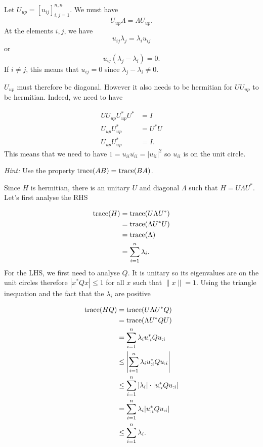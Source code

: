 \begin{solution}
  Let $U_{up} = [u_{ij}]_{i,j=1}^{n,n}$.
  We must have
  \[ U_{up}\Lambda = \Lambda U_{up}. \]
  At the elements $i,j$, we have
  \[ u_{ij} \lambda_j = \lambda_i u_{ij} \]
  or
  \[ u_{ij} (\lambda_j - \lambda_i) = 0. \]
  If $i \neq j$, this means that $u_{ij} = 0$ since $\lambda_j - \lambda_i \neq 0$.

  $U_{up}$ must therefore be diagonal.
  However it also needs to be hermitian for $UU_{up}$ to be hermitian.
  Indeed, we need to have

  \begin{align*}
    UU_{up} U_{up}^*U^* & = I\\
    U_{up} U_{up}^* & = U^*U\\
    U_{up} U_{up}^* & = I.
  \end{align*}
  This means that we need to have $1 = u_{ii}\overline{u_{ii}} = |u_{ii}|^2$
  so $u_{ii}$ is on the unit circle.
\end{solution}

\begin{solution}
  \emph{Hint:}
  Use the property $\operatorname{trace}(AB) = \operatorname{trace}(BA)$.

  Since $H$ is hermitian, there is an unitary $U$ and diagonal $\Lambda$ such that $H = U \Lambda U^*$.
  Let's first analyse the RHS

  \begin{align*}
    \operatorname{trace}(H) & = \operatorname{trace}(U \Lambda U^*)\\
              & = \operatorname{trace}(\Lambda U^*U)\\
              & = \operatorname{trace}(\Lambda)\\
              & = \sum_{i=1}^n \lambda_i.
  \end{align*}
  For the LHS, we first need to analyse $Q$.
  It is unitary so its eigenvalues are on the unit circles therefore $|x^* Q x| \leq 1$ for all $x$ such that $\|x\|=1$.
  Using the triangle inequation and the fact that the $\lambda_i$ are positive

  \begin{align*}
    \operatorname{trace}(HQ)
    & = \operatorname{trace}(U \Lambda U^* Q)\\
    & = \operatorname{trace}(\Lambda U^* Q U)\\
    & = \sum_{i=1}^n \lambda_i u_{:i}^* Q u_{:i}\\
    & \leq \left|\sum_{i=1}^n \lambda_i u_{:i}^* Q u_{:i}\right|\\
    & \leq \sum_{i=1}^n |\lambda_i| \cdot |u_{:i}^* Q u_{:i}|\\
    & = \sum_{i=1}^n \lambda_i |u_{:i}^* Q u_{:i}|\\
    & \leq \sum_{i=1}^n \lambda_i.
  \end{align*}
\end{solution}

